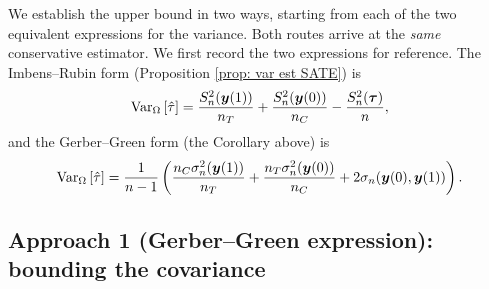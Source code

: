 \documentclass[12pt,leqno]{article}
\theoremstyle{newstyle}
\newcommand{\pov}[1]{\bm{y}(#1)}    %
\newcommand{\tauhat}{\hat{\tau}}
\newcommand{\Ssq}[2][n]{S_{#1}^{2}(#2)}
\newcommand{\ssq}[2][n]{\sigma_{#1}^{2}(#2)}
\newcommand{\scov}[2][n]{\sigma_{#1}(#2)}
\begin{document}
We establish the upper bound in two ways, starting from each of the two equivalent expressions for the variance. Both routes arrive at the \textit{same} conservative estimator. We first record the two expressions for reference. The Imbens--Rubin form (Proposition \ref{prop: var est SATE}) is
\begin{equation}
\label{eq: var IR form}
\VarZ\left[\tauhat\right] = \dfrac{\Ssq{\pov{1}}}{n_T} + \dfrac{\Ssq{\pov{0}}}{n_C} - \dfrac{\Ssq{\bm{\tau}}}{n},
\end{equation}
and the Gerber--Green form (the Corollary above) is
\begin{equation}
\label{eq: var GG form}
\VarZ\left[\tauhat\right] = \dfrac{1}{n - 1}\left(\dfrac{n_C\ssq{\pov{1}}}{n_T} + \dfrac{n_T \ssq{\pov{0}}}{n_C} + 2 \scov{\pov{0}, \pov{1}}\right).
\end{equation}

\subsection{Approach 1 (Gerber--Green expression): bounding the covariance}
\end{document}
